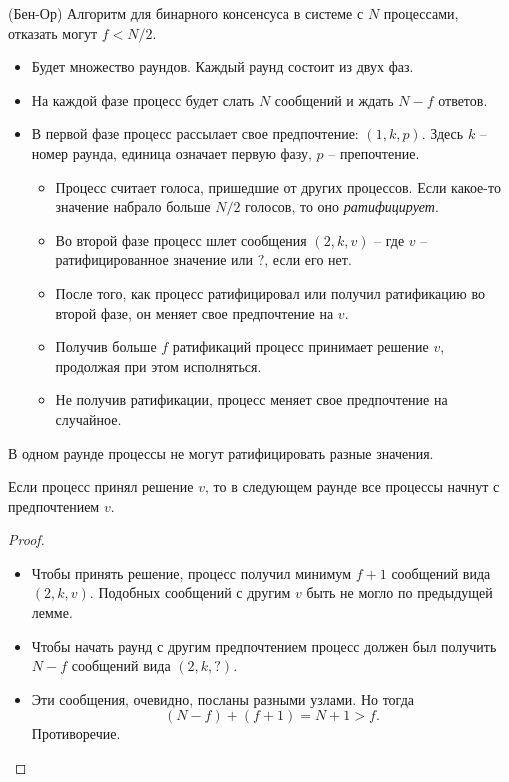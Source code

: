 \begin{algorithm}(Бен-Ор)
    Алгоритм для бинарного консенсуса в системе с $N$ процессами, отказать могут $f < N / 2$.
    \begin{itemize}
        \item Будет множество раундов. Каждый раунд состоит из двух фаз.
        \item На каждой фазе процесс будет слать $N$ сообщений и ждать
            $N - f$ ответов.
        \item В первой фазе процесс рассылает свое предпочтение:
            $(1, k, p)$. Здесь $k$ -- номер раунда, единица означает
            первую фазу, $p$ -- препочтение.
            \begin{itemize}
                \item Процесс считает голоса, пришедшие от других процессов.
                    Если какое-то значение набрало больше $N/2$ голосов,
                    то оно \textit{ратифицирует}.
                \item Во второй фазе процесс шлет сообщения $(2, k, v)$ --
                    где $v$ -- ратифицированное значение или $?$, если
                    его нет.
                \item После того, как процесс ратифицировал или получил
                    ратификацию во второй фазе, он меняет свое предпочтение на $v$.
                \item Получив больше $f$ ратификаций процесс принимает решение $v$,
                    продолжая при этом исполняться.
                \item Не получив ратификации, процесс меняет свое предпочтение
                    на случайное.
            \end{itemize}
    \end{itemize}
\end{algorithm}

\begin{lemma}
    В одном раунде процессы не могут ратифицировать разные значения.
\end{lemma}

\begin{lemma}
    Если процесс принял решение $v$, то в следующем раунде все процессы
    начнут с предпочтением $v$.
\end{lemma}
\begin{proof}
    \enewline
    \begin{itemize}
        \item Чтобы принять решение, процесс получил минимум $f + 1$
            сообщений вида $(2, k, v)$. Подобных сообщений с другим
            $v$ быть не могло по предыдущей лемме.
        \item Чтобы начать раунд с другим предпочтением процесс должен был
            получить $N - f$ сообщений вида $(2, k, ?)$.
        \item Эти сообщения, очевидно, посланы разными узлами. Но тогда
            \[
                (N - f) + (f + 1) = N + 1 > f
            .\]
            Противоречие.
    \end{itemize}
\end{proof}

